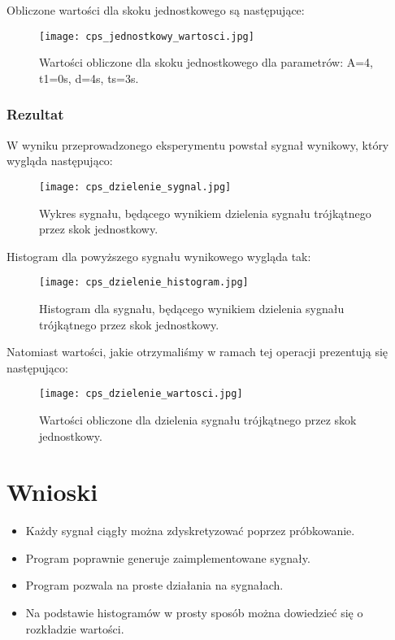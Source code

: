 \documentclass[12pt]{article}
\begin{document}
Obliczone wartości dla skoku jednostkowego są następujące:
\begin{figure}[H]
    \centering
    \texttt{[image: cps\_jednostkowy\_wartosci.jpg]}
    \caption{Wartości obliczone dla skoku jednostkowego dla parametrów:  A=4, t1=0s, d=4s, ts=3s.}
    \label{wartości dla skoku jednostkowego}
\end{figure}
\subsubsection{Rezultat}
W wyniku przeprowadzonego eksperymentu powstał sygnał wynikowy, który wygląda następująco:
\begin{figure}[H]
    \centering
    \texttt{[image: cps\_dzielenie\_sygnal.jpg]}
    \caption{Wykres sygnału, będącego wynikiem dzielenia sygnału trójkątnego przez skok jednostkowy.}
    \label{wykres dla dzielenia}
\end{figure}

Histogram dla powyższego sygnału wynikowego wygląda tak:
\begin{figure}[H]
    \centering
    \texttt{[image: cps\_dzielenie\_histogram.jpg]}
    \caption{Histogram dla sygnału, będącego wynikiem dzielenia sygnału trójkątnego przez skok jednostkowy.}
    \label{histogram dla dzielenia}
\end{figure}

Natomiast wartości, jakie otrzymaliśmy w ramach tej operacji prezentują się następująco:
\begin{figure}[H]
    \centering
    \texttt{[image: cps\_dzielenie\_wartosci.jpg]}
    \caption{Wartości obliczone dla dzielenia sygnału trójkątnego przez skok jednostkowy.}
    \label{wartości dla dzielenia}
\end{figure}




\section{Wnioski}
\begin{itemize}
    \item Każdy sygnał ciągły można zdyskretyzować poprzez próbkowanie.
    \item Program poprawnie generuje zaimplementowane sygnały.
    \item Program pozwala na proste działania na sygnałach.
    \item Na podstawie histogramów w prosty sposób można dowiedzieć się o rozkładzie wartości.
\end{itemize}
 


\renewcommand\refname{Bibliografia}


\end{document}
